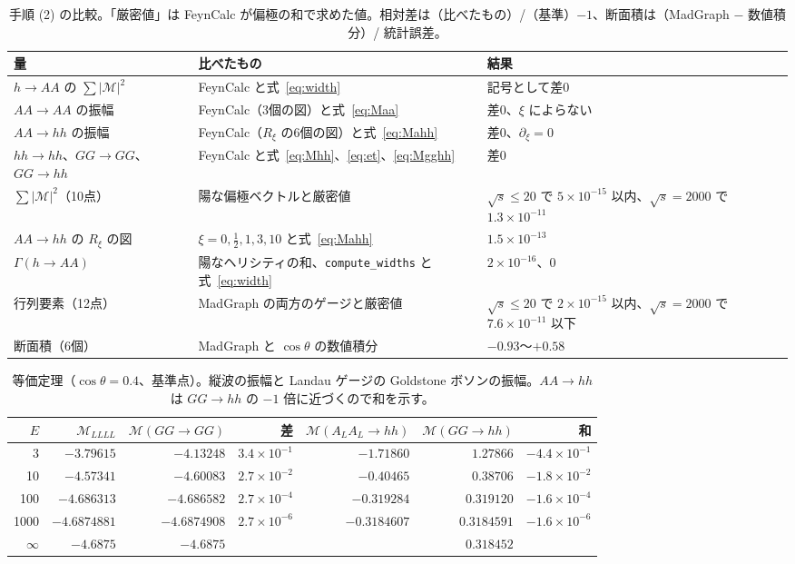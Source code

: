 \documentclass[a4paper,10pt]{ltjsarticle}
\begin{document}
\begin{table}[tbp]
\centering\small
\caption{手順 (2) の比較。「厳密値」は FeynCalc が偏極の和で求めた値。相対差は（比べたもの）/（基準）$-1$、断面積は（MadGraph $-$ 数値積分）/ 統計誤差。}
\label{tab:tree}
\begin{tabularx}{\linewidth}{>{\raggedright\arraybackslash}p{3.6cm}>{\raggedright\arraybackslash}X>{\raggedright\arraybackslash}p{4.6cm}}
\toprule
量 & 比べたもの & 結果 \\
\midrule
$h\to AA$ の $\sum|\mathcal M|^2$ & FeynCalc と式~\eqref{eq:width} & 記号として差0 \\
$AA\to AA$ の振幅 & FeynCalc（3個の図）と式~\eqref{eq:Maa} & 差0、$\xi$ によらない \\
$AA\to hh$ の振幅 & FeynCalc（$R_\xi$ の6個の図）と式~\eqref{eq:Mahh} & 差0、$\partial_\xi=0$ \\
$hh\to hh$、$GG\to GG$、$GG\to hh$ & FeynCalc と式~\eqref{eq:Mhh}、\eqref{eq:et}、\eqref{eq:Mgghh} & 差0 \\
$\sum|\mathcal M|^2$（10点） & 陽な偏極ベクトルと厳密値 & $\sqrt s\le20$ で $5\times10^{-15}$ 以内、$\sqrt s=2000$ で $1.3\times10^{-11}$ \\
$AA\to hh$ の $R_\xi$ の図 & $\xi=0,\frac12,1,3,10$ と式~\eqref{eq:Mahh} & $1.5\times10^{-13}$ \\
$\Gamma(h\to AA)$ & 陽なヘリシティの和、\texttt{compute\_widths} と式~\eqref{eq:width} & $2\times10^{-16}$、0 \\
行列要素（12点） & MadGraph の両方のゲージと厳密値 & $\sqrt s\le20$ で $2\times10^{-15}$ 以内、$\sqrt s=2000$ で $7.6\times10^{-11}$ 以下 \\
断面積（6個） & MadGraph と $\cos\theta$ の数値積分 & $-0.93$〜$+0.58$ \\
\bottomrule
\end{tabularx}
\end{table}

\begin{table}[tbp]
\centering\small
\caption{等価定理（$\cos\theta=0.4$、基準点）。縦波の振幅と Landau ゲージの Goldstone ボソンの振幅。$AA\to hh$ は $GG\to hh$ の $-1$ 倍に近づくので和を示す。}
\label{tab:et}
\begin{tabular}{rrrrrrr}
\toprule
$E$ & $\mathcal M_{LLLL}$ & $\mathcal M(GG\to GG)$ & 差 & $\mathcal M(A_LA_L\to hh)$ & $\mathcal M(GG\to hh)$ & 和 \\
\midrule
3 & $-3.79615$ & $-4.13248$ & $3.4\times10^{-1}$ & $-1.71860$ & $1.27866$ & $-4.4\times10^{-1}$ \\
10 & $-4.57341$ & $-4.60083$ & $2.7\times10^{-2}$ & $-0.40465$ & $0.38706$ & $-1.8\times10^{-2}$ \\
100 & $-4.686313$ & $-4.686582$ & $2.7\times10^{-4}$ & $-0.319284$ & $0.319120$ & $-1.6\times10^{-4}$ \\
1000 & $-4.6874881$ & $-4.6874908$ & $2.7\times10^{-6}$ & $-0.3184607$ & $0.3184591$ & $-1.6\times10^{-6}$ \\
$\infty$ & $-4.6875$ & $-4.6875$ & & & $0.318452$ & \\
\bottomrule
\end{tabular}
\end{table}
\end{document}
